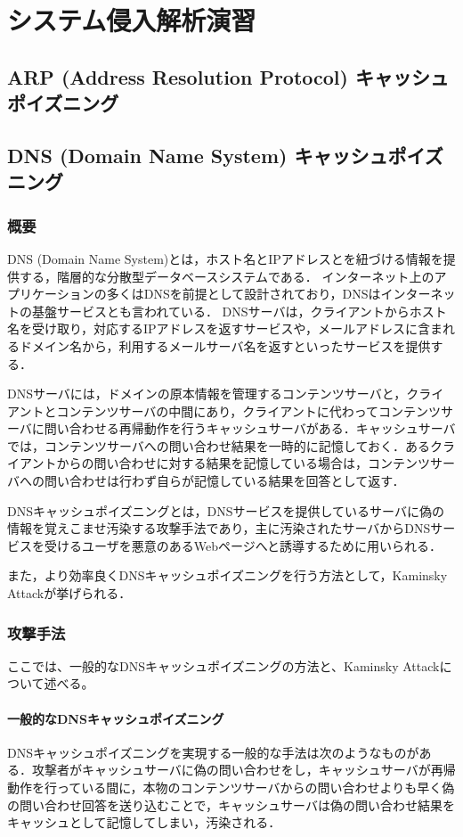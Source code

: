﻿\chapter{システム侵入解析演習}

\section{ARP (Address Resolution Protocol) キャッシュポイズニング}

\section{DNS (Domain Name System) キャッシュポイズニング}
\subsection{概要}
DNS (Domain Name System)とは，ホスト名とIPアドレスとを紐づける情報を提供する，階層的な分散型データベースシステムである．
インターネット上のアプリケーションの多くはDNSを前提として設計されており，DNSはインターネットの基盤サービスとも言われている．
DNSサーバは，クライアントからホスト名を受け取り，対応するIPアドレスを返すサービスや，メールアドレスに含まれるドメイン名から，利用するメールサーバ名を返すといったサービスを提供する．

DNSサーバには，ドメインの原本情報を管理するコンテンツサーバと，クライアントとコンテンツサーバの中間にあり，クライアントに代わってコンテンツサーバに問い合わせる再帰動作を行うキャッシュサーバがある．キャッシュサーバでは，コンテンツサーバへの問い合わせ結果を一時的に記憶しておく．あるクライアントからの問い合わせに対する結果を記憶している場合は，コンテンツサーバへの問い合わせは行わず自らが記憶している結果を回答として返す．

DNSキャッシュポイズニングとは，DNSサービスを提供しているサーバに偽の情報を覚えこませ汚染する攻撃手法であり，主に汚染されたサーバからDNSサービスを受けるユーザを悪意のあるWebページへと誘導するために用いられる．

また，より効率良くDNSキャッシュポイズニングを行う方法として，Kaminsky Attackが挙げられる．

\subsection{攻撃手法}
ここでは、一般的なDNSキャッシュポイズニングの方法と、Kaminsky Attackについて述べる。

\subsubsection{一般的なDNSキャッシュポイズニング}
DNSキャッシュポイズニングを実現する一般的な手法は次のようなものがある．攻撃者がキャッシュサーバに偽の問い合わせをし，キャッシュサーバが再帰動作を行っている間に，本物のコンテンツサーバからの問い合わせよりも早く偽の問い合わせ回答を送り込むことで，キャッシュサーバは偽の問い合わせ結果をキャッシュとして記憶してしまい，汚染される．

